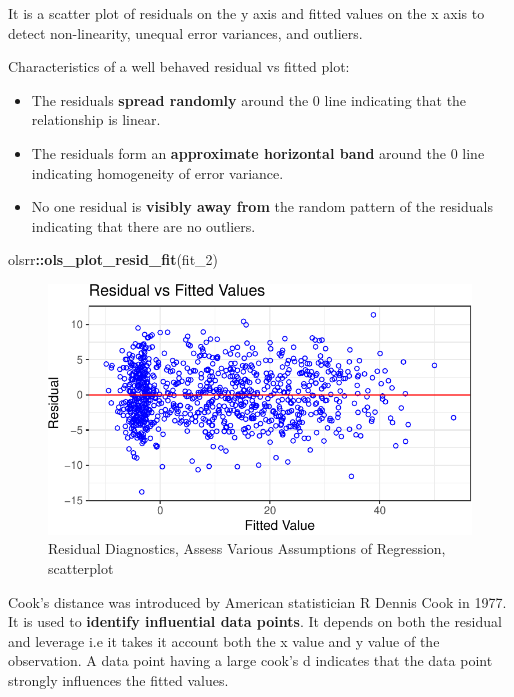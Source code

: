 \documentclass[
]{article}
\newenvironment{Shaded}{\begin{snugshade}}{\end{snugshade}}
\newcommand{\FunctionTok}[1]{\textcolor[rgb]{0.13,0.29,0.53}{\textbf{#1}}}
\newcommand{\NormalTok}[1]{#1}
\newcommand{\SpecialCharTok}[1]{\textcolor[rgb]{0.81,0.36,0.00}{\textbf{#1}}}
\begin{document}
\clearpage

It is a scatter plot of residuals on the y axis and fitted values on the
x axis to detect non-linearity, unequal error variances, and outliers.

Characteristics of a well behaved residual vs fitted plot:

\begin{itemize}
\item
  The residuals \textbf{spread randomly} around the 0 line indicating
  that the relationship is linear.
\item
  The residuals form an \textbf{approximate horizontal band} around the
  0 line indicating homogeneity of error variance.
\item
  No one residual is \textbf{visibly away from} the random pattern of
  the residuals indicating that there are no outliers.
\end{itemize}

\begin{Shaded}
\begin{Highlighting}[]
\NormalTok{olsrr}\SpecialCharTok{::}\FunctionTok{ols\_plot\_resid\_fit}\NormalTok{(fit\_2)}
\end{Highlighting}
\end{Shaded}

\begin{figure}[hb]

\includegraphics{Appendix_ex_weightloss_files/figure-latex/unnamed-chunk-76-1} \hfill{}

\caption{Residual Diagnostics, Assess Various Assumptions of Regression, scatterplot}\label{fig:unnamed-chunk-76}
\end{figure}

\clearpage

Cook's distance was introduced by American statistician R Dennis Cook in
1977. It is used to \textbf{identify influential data points}. It
depends on both the residual and leverage i.e it takes it account both
the x value and y value of the observation. A data point having a large
cook's d indicates that the data point strongly influences the fitted
values.
\end{document}
